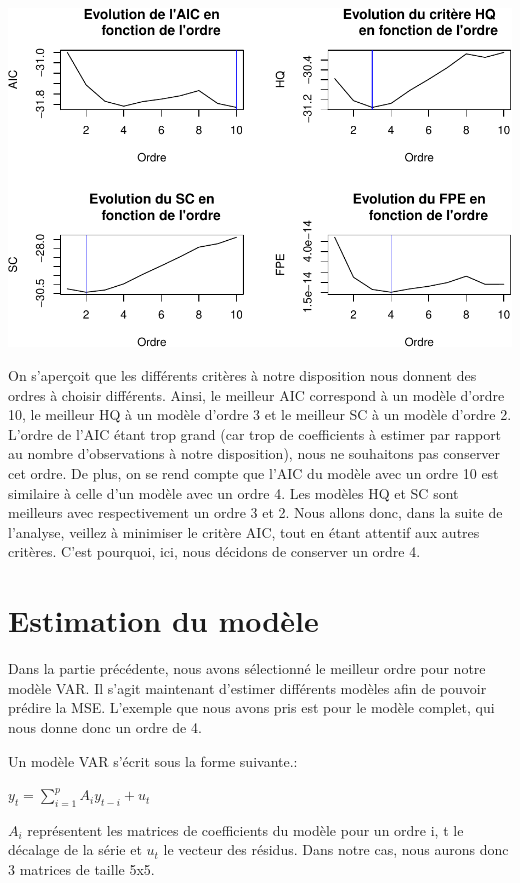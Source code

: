 \documentclass[11pt,]{article}
\begin{document}
\includegraphics{doc_files/figure-latex/unnamed-chunk-10-1.pdf}

On s'aperçoit que les différents critères à notre disposition nous
donnent des ordres à choisir différents. Ainsi, le meilleur AIC
correspond à un modèle d'ordre 10, le meilleur HQ à un modèle d'ordre 3
et le meilleur SC à un modèle d'ordre 2. L'ordre de l'AIC étant trop
grand (car trop de coefficients à estimer par rapport au nombre
d'observations à notre disposition), nous ne souhaitons pas conserver
cet ordre. De plus, on se rend compte que l'AIC du modèle avec un ordre
10 est similaire à celle d'un modèle avec un ordre 4. Les modèles HQ et
SC sont meilleurs avec respectivement un ordre 3 et 2. Nous allons donc,
dans la suite de l'analyse, veillez à minimiser le critère AIC, tout en
étant attentif aux autres critères. C'est pourquoi, ici, nous décidons
de conserver un ordre 4.

\section{Estimation du modèle}\label{estimation-du-modele}

Dans la partie précédente, nous avons sélectionné le meilleur ordre pour
notre modèle VAR. Il s'agit maintenant d'estimer différents modèles afin
de pouvoir prédire la MSE. L'exemple que nous avons pris est pour le
modèle complet, qui nous donne donc un ordre de 4.

Un modèle VAR s'écrit sous la forme suivante.:

\(y_t = \sum_{i = 1}^{p} {A_iy_{t-i}} + u_t\)

\(A_i\) représentent les matrices de coefficients du modèle pour un
ordre i, t le décalage de la série et \(u_t\) le vecteur des résidus.
Dans notre cas, nous aurons donc 3 matrices de taille 5x5.
\end{document}
